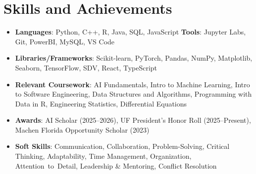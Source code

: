 \documentclass[letterpaper,9.7pt]{article}
\newcommand{\resumeSubHeadingListStart}{\begin{itemize}[leftmargin=0pt,label={},itemsep=2pt]}
\newcommand{\resumeSubHeadingListEnd}{\end{itemize}}
\begin{document}
\section{\textbf{Skills and Achievements}}
\resumeSubHeadingListStart
  \item{\textbf{Languages}: Python, C++, R, Java, SQL, JavaScript \textbf{Tools}: Jupyter Labs, Git, PowerBI, MySQL, VS Code}
  \item{\textbf{Libraries/Frameworks}: Scikit-learn, PyTorch, Pandas, NumPy, Matplotlib, Seaborn, TensorFlow, SDV, React, TypeScript}
  \item{\textbf{Relevant Coursework}: AI Fundamentals, Intro to Machine Learning, Intro to Software Engineering, Data Structures and Algorithms, Programming with Data in R, Engineering Statistics, Differential Equations}
  \item{\textbf{Awards}: AI Scholar (2025--2026), UF President’s Honor Roll (2025--Present), Machen Florida Opportunity Scholar (2023)}
  \item{\textbf{Soft Skills}: Communication, Collaboration, Problem-Solving, Critical Thinking, Adaptability, Time Management, Organization, \mbox{Attention to Detail}, Leadership \& Mentoring, Conflict Resolution}
\resumeSubHeadingListEnd
\end{document}
